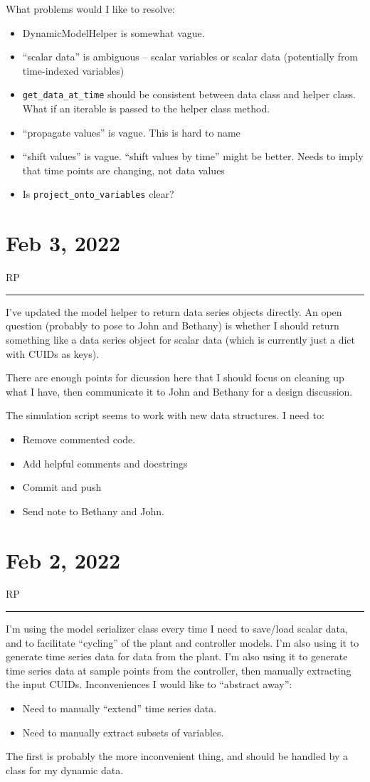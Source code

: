 \documentclass{article}
\newcommand{\RP}{\vspace{0.5cm}RP\vspace{0.2cm}\hrule\vspace{0.2cm}}
\begin{document}
What problems would I like to resolve:
\begin{itemize}
  \item DynamicModelHelper is somewhat vague.
  \item ``scalar data'' is ambiguous -- scalar variables or
    scalar data (potentially from time-indexed variables)
  \item \texttt{get\_data\_at\_time} should be consistent
    between data class and helper class. What if an iterable is
    passed to the helper class method.
  \item ``propagate values'' is vague. This is hard to name
  \item ``shift values'' is vague. ``shift values by time''
    might be better. Needs to imply that time points are changing,
    not data values
  \item Is \texttt{project\_onto\_variables} clear?
\end{itemize}

\section{Feb 3, 2022}

\RP
I've updated the model helper to return data series objects directly.
An open question (probably to pose to John and Bethany) is whether
I should return something like a data series object for scalar
data (which is currently just a dict with CUIDs as keys).

There are enough points for dicussion here that I should focus on cleaning up
what I have, then communicate it to John and Bethany for a design discussion.

\medskip

The simulation script seems to work with new data structures.
I need to:
\begin{itemize}
  \item Remove commented code.
  \item Add helpful comments and docstrings
  \item Commit and push
  \item Send note to Bethany and John.
\end{itemize}

\section{Feb 2, 2022}

\RP
I'm using the model serializer class every time I need to save/load scalar data,
and to facilitate ``cycling'' of the plant and controller models.
I'm also using it to generate time series data for data from the plant.
I'm also using it to generate time series data at sample points from the
controller, then manually extracting the input CUIDs.
Inconveniences I would like to ``abstract away'':
\begin{itemize}
  \item Need to manually ``extend'' time series data.
  \item Need to manually extract subsets of variables.
\end{itemize}
The first is probably the more inconvenient thing, and should be handled by
a class for my dynamic data.
\end{document}

